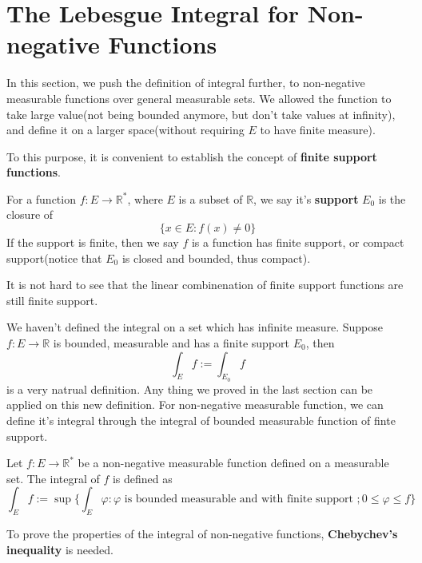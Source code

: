 \documentclass[lang=en, 12pt]{elegantbook}
\newcommand{\RR}{\mathbb{R}}
\begin{document}
        \section{The Lebesgue Integral for Non-negative Functions}
            In this section, we push the definition of integral further, to non-negative measurable functions over general measurable 
        sets. We allowed the function to take large value(not being bounded anymore, but don't take values at infinity), and define it on a larger space(without requiring
        $E$ to have finite measure).\par  
            To this purpose, it is convenient to establish the concept of \textbf{finite support functions}.
            \begin{definition}[Support]
                For a function $f:E \to \RR^*$, where $E$ is a subset of $\RR$, we say it's \textbf{support} $E_0$ is the closure of 
            $$\{x\in E: f(x) \neq 0\}$$
                If the support is finite, then we say $f$ is a function has finite support, or compact support(notice that $E_0$ is closed 
            and bounded, thus compact).
            \end{definition}\par
            It is not hard to see that the linear combinenation of finite support functions are still finite support.\par 
            We haven't defined the integral on a set which has infinite measure. Suppose $f:E\to \RR$ is bounded, measurable
        and has a finite support $E_0$, then $$\int_E f := \int_{E_0} f$$
        is a very natrual definition. Any thing we proved in the last section can be applied on this new definition. For non-negative 
        measurable function, we can define it's integral through the integral of bounded measurable function of finte support.
            \begin{definition}
                Let $f:E \to \RR^*$ be a non-negative measurable function defined on a measurable set. The integral of $f$ is defined as 
            \begin{equation}
                \int_E f := \sup\{\int_E \varphi : \varphi \mbox{ is bounded measurable and with finite support }; 0\leq \varphi \leq f\}
            \end{equation}
            \end{definition}
            To prove the properties of the integral of non-negative functions, \textbf{Chebychev's inequality} is needed.
\end{document}
